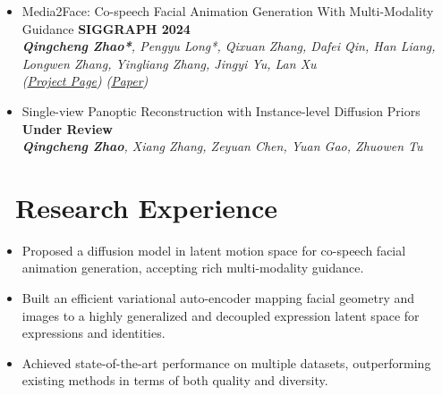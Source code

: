 \documentclass{resume}
\begin{document}
\begin{itemize}
  \item {\small Media2Face: Co-speech Facial Animation Generation With Multi-Modality Guidance} \hfill{\textbf{SIGGRAPH 2024}}\\
        \textit{\footnotesize \textbf{Qingcheng Zhao*}, Pengyu Long*, Qixuan Zhang, Dafei Qin, Han Liang, Longwen Zhang, Yingliang Zhang, Jingyi Yu, Lan Xu}\\
        \textit{(\href{https://sites.google.com/view/media2face}{Project Page})}
        \textit{(\href{https://dl.acm.org/doi/10.1145/3641519.3657413}{Paper})}
      
  \item {Single-view Panoptic Reconstruction with Instance-level Diffusion Priors} \hfill{\textbf{Under Review}}\\
        \textit{\small \textbf{Qingcheng Zhao}, Xiang Zhang, Zeyuan Chen, Yuan Gao, Zhuowen Tu}

\end{itemize}


\section{\faFlask\ Research Experience}



\begin{itemize}
  \item Proposed a diffusion model in latent motion space for co-speech facial animation generation, accepting rich multi-modality guidance.
  \item Built an efficient variational auto-encoder mapping facial geometry and images to a highly generalized and decoupled expression latent space for expressions and identities.
  \item Achieved state-of-the-art performance on multiple datasets, outperforming existing methods in terms of both quality and diversity.
\end{itemize}
\end{document}
